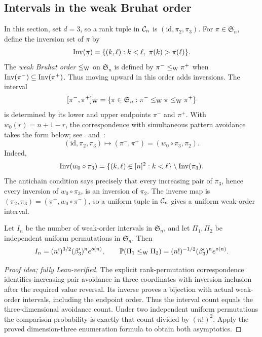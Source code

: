 \documentclass[11pt,letterpaper]{article}
\begin{document}
\subsection{Intervals in the weak Bruhat order}

In this section, set $d=3$, so a rank tuple in $\cC_n$ is $(\mathrm{id},\pi_2,\pi_3)$. For $\pi\in\mathfrak S_n$, define the inversion set of $\pi$ by
\[
      \Inv(\pi)=\{(k,\ell):k<\ell,\ \pi(k)>\pi(\ell)\}.
\]
The {\em weak Bruhat order} $\le_{\rm W}$ on $\mathfrak S_n$ is defined by $\pi^-\le_{\rm W}\pi^+$ when $\Inv(\pi^-)\subseteq\Inv(\pi^+)$. Thus moving upward in this order adds inversions. The interval
\[
      [\pi^-,\pi^+]_{\rm W}=\{\pi\in\mathfrak S_n:\pi^-\le_{\rm W}\pi\le_{\rm W}\pi^+\}
\]
is determined by its lower and upper endpoints $\pi^-$ and $\pi^+$. With $w_0(r)=n+1-r$, the correspondence with simultaneous pattern avoidance takes the form below; see~\cite{GP} and~\cite[Proposition~5]{BM}:
\begin{equation}\label{eq:interval-map}
      (\mathrm{id},\pi_2,\pi_3)\longmapsto (\pi^-,\pi^+)=(w_0\circ\pi_3,\pi_2).
\end{equation}
Indeed,
\[
      \Inv(w_0\circ\pi_3)=\{(k,\ell)\in[n]^2:k<\ell\}\setminus\Inv(\pi_3).
\]
The antichain condition says precisely that every increasing pair of $\pi_3$, hence every inversion of $w_0\circ\pi_3$, is an inversion of $\pi_2$. The inverse map is $(\pi_2,\pi_3)=(\pi^+,w_0\circ\pi^-)$, so a uniform tuple in $\cC_n$ gives a uniform weak-order interval.


\begin{proposition}
      Let $I_n$ be the number of weak-order intervals in $\mathfrak S_n$, and let $\Pi_1,\Pi_2$ be independent uniform permutations in $\mathfrak S_n$. Then
      \[
            I_n=(n!)^{3/2}(\beta_3')^n e^{o(n)},\qquad \P(\Pi_1\le_{\rm W}\Pi_2)=(n!)^{-1/2}(\beta_3')^n e^{o(n)}.
      \]
\end{proposition}

\begin{proof}[Proof idea; fully Lean-verified]
The explicit rank-permutation correspondence identifies increasing-pair avoidance in three coordinates with inversion inclusion after the required value reversal. Its inverse proves a bijection with actual weak-order intervals, including the endpoint order. Thus the interval count equals the three-dimensional avoidance count. Under two independent uniform permutations the comparison probability is exactly that count divided by $(n!)^2$. Apply the proved dimension-three enumeration formula to obtain both asymptotics.
\end{proof}
\end{document}
